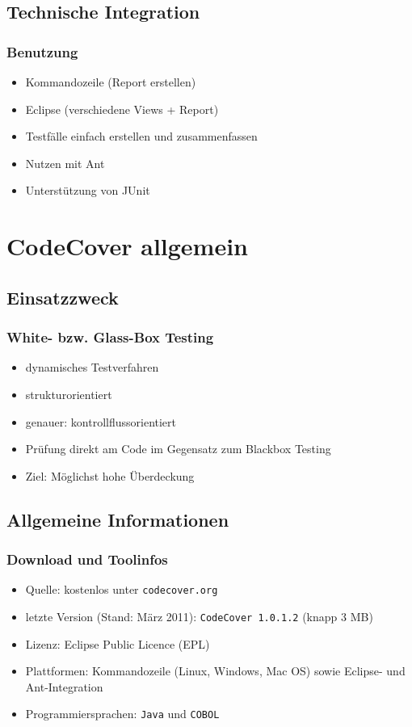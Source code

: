 \documentclass{beamer}
\begin{document}
  \subsection{Technische Integration}
  \begin{frame}\frametitle{Benutzung}
    \begin{itemize}[<+->]
      \item Kommandozeile (Report erstellen)
      \item Eclipse (verschiedene Views + Report)
      \item Testfälle einfach erstellen und zusammenfassen
      \item Nutzen mit Ant
      \item Unterstützung von JUnit
    \end{itemize}
  \end{frame}

  \section{CodeCover allgemein}
  \subsection{Einsatzzweck}
  \begin{frame}\frametitle{White- bzw. Glass-Box Testing}
    \begin{itemize}[<+->]
      \item dynamisches Testverfahren
      \item strukturorientiert
      \item genauer: kontrollflussorientiert
      \item Prüfung direkt am Code im Gegensatz zum Blackbox Testing
      \item Ziel: Möglichst hohe Überdeckung
    \end{itemize}
  \end{frame}

  \subsection{Allgemeine Informationen}
  \begin{frame}\frametitle{Download und Toolinfos}
    \begin{itemize}[<+->]
      \item Quelle: kostenlos unter \texttt{codecover.org}
      \item letzte Version (Stand: März 2011): \texttt{CodeCover 1.0.1.2} (knapp 3 MB)
      \item Lizenz: Eclipse Public Licence (EPL)
      \item Plattformen: Kommandozeile (Linux, Windows, Mac OS) sowie Eclipse- und Ant-Integration
      \item Programmiersprachen: \texttt{Java} und \texttt{COBOL}
    \end{itemize}
  \end{frame}
\end{document}
